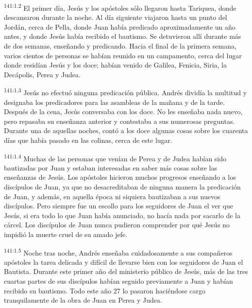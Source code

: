 \par
\textsuperscript{141:1.2} El primer día, Jesús y los apóstoles sólo llegaron hasta Tariquea, donde descansaron durante la noche. Al día siguiente viajaron hasta un punto del Jordán, cerca de Pella, donde Juan había predicado aproximadamente un año antes, y donde Jesús había recibido el bautismo. Se detuvieron allí durante más de dos semanas, enseñando y predicando. Hacia el final de la primera semana, varios cientos de personas se habían reunido en un campamento, cerca del lugar donde residían Jesús y los doce; habían venido de Galilea, Fenicia, Siria, la Decápolis, Perea y Judea.

\par
\textsuperscript{141:1.3} Jesús no efectuó ninguna predicación pública. Andrés dividía la multitud y designaba los predicadores para las asambleas de la mañana y de la tarde. Después de la cena, Jesús conversaba con los doce. No les enseñaba nada nuevo, pero repasaba su enseñanza anterior y contestaba a sus numerosas preguntas. Durante una de aquellas noches, contó a los doce algunas cosas sobre los cuarenta días que había pasado en las colinas, cerca de este lugar.

\par
\textsuperscript{141:1.4} Muchas de las personas que venían de Perea y de Judea habían sido bautizadas por Juan y estaban interesadas en saber más cosas sobre las enseñanzas de Jesús. Los apóstoles hicieron muchos progresos enseñando a los discípulos de Juan, ya que no desacreditaban de ninguna manera la predicación de Juan, y además, en aquella época ni siquiera bautizaban a sus nuevos discípulos. Pero siempre fue un escollo para los seguidores de Juan el ver que Jesús, si era todo lo que Juan había anunciado, no hacía nada por sacarlo de la cárcel. Los discípulos de Juan nunca pudieron comprender por qué Jesús no impidió la muerte cruel de su amado jefe.

\par
\textsuperscript{141:1.5} Noche tras noche, Andrés enseñaba cuidadosamente a sus compañeros apóstoles la tarea delicada y difícil de llevarse bien con los seguidores de Juan el Bautista. Durante este primer año del ministerio público de Jesús, más de las tres cuartas partes de sus discípulos habían seguido previamente a Juan y habían recibido su bautismo. Todo este año 27 lo pasaron haciéndose cargo tranquilamente de la obra de Juan en Perea y Judea.

